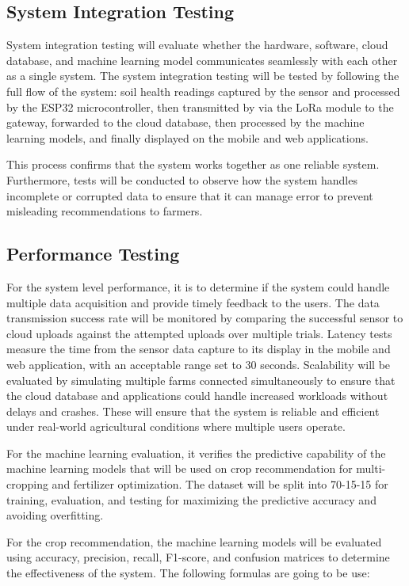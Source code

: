 {	\subsection{System Integration Testing}
	System integration testing will evaluate whether the hardware, software, cloud database, and machine learning model communicates seamlessly with each other as a single system. The system integration testing will be tested by following the full flow of the system: soil health readings captured by the sensor and processed by the ESP32 microcontroller, then transmitted by via the LoRa module to the gateway, forwarded to the cloud database, then processed by the machine learning models, and finally displayed on the mobile and web applications. 
	
	This process confirms that the system works together as one reliable system. Furthermore, tests will be conducted to observe how the system handles incomplete or corrupted data to ensure that it can manage error to prevent misleading recommendations to farmers.
	
	\subsection{Performance Testing}
	For the system level performance, it is to determine if the system could handle multiple data acquisition and provide timely feedback to the users. The data transmission success rate will be monitored by comparing the successful sensor to cloud uploads against the attempted uploads over multiple trials. Latency tests measure the time from the sensor data capture to its display in the mobile and web application, with an acceptable range set to 30 seconds. Scalability will be evaluated by simulating multiple farms connected simultaneously to ensure that the cloud database and applications could handle increased workloads without delays and crashes. These will ensure that the system is reliable and efficient under real-world agricultural conditions where multiple users operate.
	
	For the machine learning evaluation, it verifies the predictive capability of the machine learning models that will be used on crop recommendation for multi-cropping and fertilizer optimization. The dataset will be split into 70-15-15 for training, evaluation, and testing for maximizing the predictive accuracy and avoiding overfitting. 
	
	For the crop recommendation, the machine learning models will be evaluated using accuracy, precision, recall, F1-score, and confusion matrices to determine the effectiveness of the system. The following formulas are going to be use:
	
}
